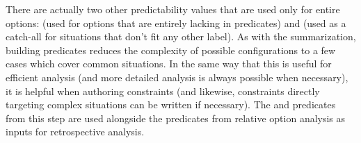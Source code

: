\begin{enumerate}
    There are actually two other predictability values that are used only for entire options:  (used for options that are entirely lacking in  predicates) and  (used as a catch-all for situations that don't fit any other label).
    As with the  summarization, building  predicates reduces the complexity of possible  configurations to a few cases which cover common situations.
    In the same way that this is useful for efficient analysis (and more detailed analysis is always possible when necessary), it is helpful when authoring constraints (and likewise, constraints directly targeting complex  situations can be written if necessary).
    The  and  predicates from this step are used alongside the  predicates from relative option analysis as inputs for retrospective analysis.



\end{enumerate}
